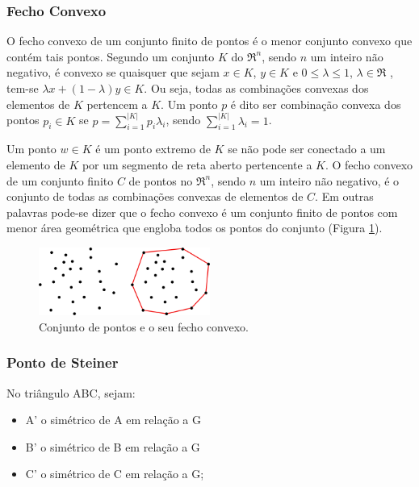 \subsubsection{Fecho Convexo}

O fecho convexo de um conjunto finito de pontos é o menor conjunto convexo que contém tais pontos. Segundo \cite{bib:Carvalho91} um conjunto $K$ do $\Re^{n}$, sendo $n$ um inteiro não negativo, é convexo se quaisquer que sejam  $x \in K$, $y \in K$ e $0 \leq \lambda \leq 1$, $\lambda \in \Re$ , tem-se $\lambda x + (1-\lambda)y \in K $. Ou seja, todas as combinações convexas dos elementos de $K$ pertencem a $K$. Um ponto $p$ é dito ser combinação convexa dos pontos $p_{i} \in K$  se $p = \displaystyle\sum_{i=1}^{|K|} p_{i}\lambda_i $, sendo $ \displaystyle\sum_{i=1}^{|K|} \lambda_i = 1 $.

Um ponto $w \in K$ é um ponto extremo de $K$ se não pode ser conectado a um elemento de $K$ por um segmento de reta aberto pertencente a $K$. O fecho convexo de um conjunto finito $C$ de pontos no $\Re^{n}$, sendo $n$ um inteiro não negativo, é o conjunto de todas as combinações convexas de elementos de $C$. Em outras palavras pode-se dizer que o fecho convexo é um conjunto finito de pontos com menor área geométrica que engloba todos os pontos do conjunto (Figura \ref{fig:fecho convexo}).

 \begin{figure}[htbp]
     \centering
     \includegraphics[width=0.5\textwidth]{fig/fecho_convexo.png}
     \caption{Conjunto de pontos e o seu fecho convexo.} 
     \label{fig:fecho convexo}
 \end{figure}

\subsubsection{Ponto de Steiner}

No triângulo ABC, sejam:
\begin{itemize}
  \item A’ o simétrico de A em relação a G
  \item B’ o simétrico de B em relação a G
  \item C’ o simétrico de C em relação a G;
\end{itemize}

